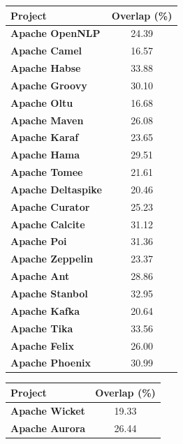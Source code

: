	\begin{table}[htbp]
	\small
	\centering

		\begin{tabular}{l|c}
			\hline
			\textbf{Project}           & \textbf{Overlap (\%)} \\ \hline
			\textbf{Apache OpenNLP}    &    24.39     \\ \hline
			\textbf{Apache Camel}      &    16.57     \\ \hline
			\textbf{Apache Habse}      &    33.88     \\ \hline
			\textbf{Apache Groovy}     &    30.10     \\ \hline
			\textbf{Apache Oltu}       &    16.68     \\ \hline
			\textbf{Apache Maven}      &    26.08     \\ \hline
			\textbf{Apache Karaf}      &    23.65     \\ \hline
			\textbf{Apache Hama}       &    29.51     \\ \hline
			\textbf{Apache Tomee}      &    21.61     \\ \hline
			\textbf{Apache Deltaspike} &    20.46     \\ \hline
			\textbf{Apache Curator}    &    25.23     \\ \hline
			\textbf{Apache Calcite}    &    31.12     \\ \hline
			\textbf{Apache Poi}        &    31.36     \\ \hline
			\textbf{Apache Zeppelin}   &    23.37     \\ \hline
			\textbf{Apache Ant}        &    28.86     \\ \hline
			\textbf{Apache Stanbol}    &    32.95     \\ \hline
			\textbf{Apache Kafka}      &    20.64     \\ \hline
			\textbf{Apache Tika}       &    33.56     \\ \hline
			\textbf{Apache Felix}      &    26.00     \\ \hline
			\textbf{Apache Phoenix}    &    30.99     \\ \hline
		\end{tabular}
\quad \quad \quad
\begin{tabular}{l|c}
	\hline
			\textbf{Project}           & \textbf{Overlap (\%)} \\ \hline
			\textbf{Apache Wicket}     &    19.33     \\ \hline
			\textbf{Apache Aurora}     &    26.44     \\ \hline

\end{tabular}
\end{table}
